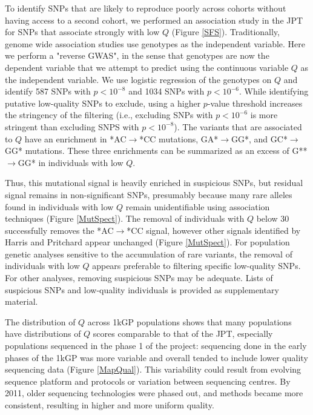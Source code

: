 \documentclass[9pt,lineno]{elife}
\begin{document}
To identify SNPs that are likely to reproduce poorly across cohorts without having access to a second cohort, we performed an association study in the JPT for SNPs that associate strongly with low $Q$ (Figure \ref{SFS}).
Traditionally, genome wide association studies use genotypes as the independent variable. 
Here we perform a "reverse GWAS", in the sense that genotypes are now the dependent variable that we attempt to predict using the continuous variable $Q$ as the independent variable.
We use logistic regression of the genotypes on $Q$ and identify 587 SNPs with $p < 10^{-8}$ and 1034 SNPs with $ p < 10^{-6}$. 
While identifying putative low-quality SNPs to exclude, using a higher $p$-value threshold increases the stringency of the filtering (i.e., excluding SNPs with $ p < 10^{-6}$ is more stringent than excluding SNPS with $p < 10^{-8}$). 
The variants that are associated to $Q$ have an enrichment in *AC${\rightarrow}$*CC mutations, GA*${\rightarrow}$GG*, and GC*${\rightarrow}$GG* mutations.
These three enrichments can be summarized as an excess of G**${\rightarrow}$GG* in individuals with low $Q$.

Thus, this mutational signal is heavily enriched in suspicious SNPs, but residual signal remains in non-significant SNPs, presumably because many rare alleles found in individuals with low $Q$ remain unidentifiable using association techniques (Figure \ref{MutSpect}).
The removal of individuals with $Q$ below 30 successfully removes the *AC${\rightarrow}$*CC signal, however other signals identified by Harris and Pritchard appear unchanged (Figure \ref{MutSpect}).
For population genetic analyses sensitive to the accumulation of rare variants, the removal of individuals with low $Q$ appears preferable to filtering specific low-quality SNPs. 
For other analyses, removing suspicious SNPs may be adequate. 
Lists of suspicious SNPs and low-quality individuals is provided as supplementary material.

The distribution of $Q$ across 1kGP populations shows that many populations have distributions of $Q$ scores comparable to that of the JPT, especially populations sequenced in the phase 1 of the project: sequencing done in the early phases of the 1kGP was more variable and overall tended to include lower quality sequencing data (Figure \ref{MapQual}).
This variability could result from evolving sequence platform and protocols or variation between sequencing centres. 
By 2011, older sequencing technologies were phased out, and methods became more consistent, resulting in higher and more uniform quality.
\end{document}
